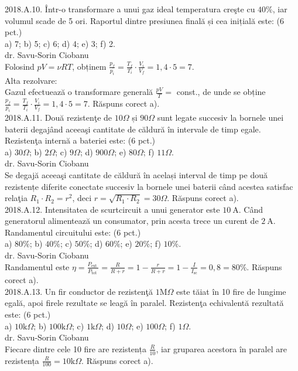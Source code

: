 2018.A.10. Într-o transformare a unui gaz ideal temperatura creşte cu $40 \%$, iar volumul scade de 5 ori. Raportul dintre presiunea finală și cea inițială este: (6 pct.)\\ a) 7; b) 5; c) 6; d) 4; e) 3; f) 2.\\ dr. Savu-Sorin Ciobanu\\ Folosind $p V=\nu R T$, obținem $\frac{p_{f}}{p_{i}}=\frac{T_{f}}{T_{i}} \cdot \frac{V_{i}}{V_{f}}=1,4 \cdot 5=7$.\\ Alta rezolvare:\\ Gazul efectuează o transformare generală $\frac{p V}{T}=$ const., de unde se obține $\frac{p_{f}}{p_{i}}=\frac{T_{f}}{T_{i}} \cdot \frac{V_{i}}{V_{f}}=1,4 \cdot 5=7$. Răspuns corect a).\\

2018.A.11. Două rezistenţe de $10 \Omega$ și $90 \Omega$ sunt legate succesiv la bornele unei baterii degajând aceeaşi cantitate de căldură în intervale de timp egale. Rezistenţa internă a bateriei este: (6 pct.)\\ a) $30 \Omega$; b) $2 \Omega$; c) $9 \Omega$; d) $900 \Omega$; e) $80 \Omega$; f) $11 \Omega$.\\ dr. Savu-Sorin Ciobanu\\ Se degajă aceeaşi cantitate de căldură în același interval de timp pe două rezistențe diferite conectate succesiv la bornele unei baterii când acestea satisfac relaţia $R_{1} \cdot R_{2}=r^{2}$, deci $r=\sqrt{R_{1} \cdot R_{2}}=30 \Omega$. Răspuns corect a).\\

2018.A.12. Intensitatea de scurtcircuit a unui generator este $10 \mathrm{~A}$. Când generatorul alimentează un consumator, prin acesta trece un curent de $2 \mathrm{~A}$. Randamentul circuitului este: (6 pct.)\\ a) $80 \%$; b) $40 \%$; c) $50 \%$; d) $60 \%$; e) $20 \%$; f) $10 \%$.\\ dr. Savu-Sorin Ciobanu\\ Randamentul este $\eta=\frac{P_{\text {ext }}}{P_{\text {tot }}}=\frac{R}{R+r}=1-\frac{r}{R+r}=1-\frac{I}{I_{\text{sc}}}=0,8=80 \%$. Răspuns corect a).\\

2018.A.13. Un fir conductor de rezistenţă $1 \mathrm{M} \Omega$ este tăiat în 10 fire de lungime egală, apoi firele rezultate se leagă în paralel. Rezistenţa echivalentă rezultată este: (6 pct.)\\ a) $10 \mathrm{k} \Omega$; b) $100 \mathrm{k} \Omega$; c) $1 \mathrm{k} \Omega$; d) $10 \Omega$; e) $100 \Omega$; f) $1 \Omega$.\\ dr. Savu-Sorin Ciobanu\\ Fiecare dintre cele 10 fire are rezistența $\frac{R}{10}$, iar gruparea acestora în paralel are rezistența $\frac{R}{100}=10 \mathrm{k} \Omega$. Răspuns corect a).\\

